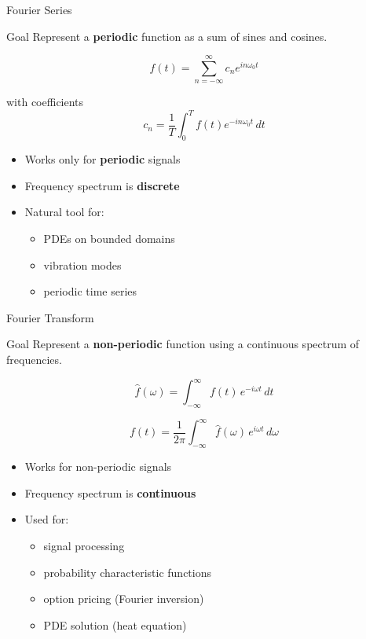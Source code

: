 \documentclass[aspectratio=169]{beamer}
\begin{document}
\begin{frame}{Fourier Series}

\begin{block}{Goal}
Represent a \textbf{periodic} function as a sum of sines and cosines.
\end{block}
\pause
\[
f(t) = \sum_{n=-\infty}^{\infty} c_n e^{i n \omega_0 t}
\]

with coefficients
\[
c_n = \frac{1}{T} \int_{0}^{T} f(t)e^{-in\omega_0 t}\, dt
\]
\pause
\begin{itemize}
    \item Works only for \textbf{periodic} signals
    \item Frequency spectrum is \textbf{discrete}
    \item Natural tool for:
    \begin{itemize}
        \item PDEs on bounded domains
        \item vibration modes
        \item periodic time series
    \end{itemize}
\end{itemize}

\end{frame}

\begin{frame}{Fourier Transform}

\begin{block}{Goal}
Represent a \textbf{non-periodic} function using a continuous spectrum of frequencies.
\end{block}
\pause
\[
\hat{f}(\omega)=\int_{-\infty}^{\infty} f(t)\, e^{-i\omega t}\,dt
\]

\[
f(t)=\frac{1}{2\pi}\int_{-\infty}^{\infty} \hat{f}(\omega)\, e^{i\omega t}\, d\omega
\]
\pause
\begin{itemize}
    \item Works for non-periodic signals
    \item Frequency spectrum is \textbf{continuous}
    \item Used for:
    \begin{itemize}
        \item signal processing
        \item probability characteristic functions
        \item option pricing (Fourier inversion)
        \item PDE solution (heat equation)
    \end{itemize}
\end{itemize}
\pause
\end{frame}
\end{document}
